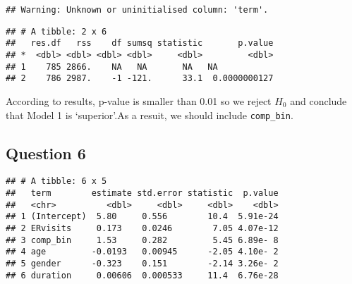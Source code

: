 \documentclass[]{article}
\newenvironment{Shaded}{\begin{snugshade}}{\end{snugshade}}
\newcommand{\KeywordTok}[1]{\textcolor[rgb]{0.13,0.29,0.53}{\textbf{#1}}}
\newcommand{\DataTypeTok}[1]{\textcolor[rgb]{0.13,0.29,0.53}{#1}}
\newcommand{\StringTok}[1]{\textcolor[rgb]{0.31,0.60,0.02}{#1}}
\newcommand{\CommentTok}[1]{\textcolor[rgb]{0.56,0.35,0.01}{\textit{#1}}}
\newcommand{\OperatorTok}[1]{\textcolor[rgb]{0.81,0.36,0.00}{\textbf{#1}}}
\newcommand{\NormalTok}[1]{#1}
\begin{document}
\begin{verbatim}
## Warning: Unknown or uninitialised column: 'term'.
\end{verbatim}

\begin{verbatim}
## # A tibble: 2 x 6
##   res.df   rss    df sumsq statistic       p.value
## *  <dbl> <dbl> <dbl> <dbl>     <dbl>         <dbl>
## 1    785 2866.    NA   NA       NA   NA           
## 2    786 2987.    -1 -121.      33.1  0.0000000127
\end{verbatim}

According to results, p-value is smaller than 0.01 so we reject \(H_0\)
and conclude that Model 1 is `superior'.As a resuit, we should include
\texttt{comp\_bin}.

\subsection{Question 6}\label{question-6}

\begin{Shaded}
\end{Shaded}

\begin{verbatim}
## # A tibble: 6 x 5
##   term        estimate std.error statistic  p.value
##   <chr>          <dbl>     <dbl>     <dbl>    <dbl>
## 1 (Intercept)  5.80     0.556        10.4  5.91e-24
## 2 ERvisits     0.173    0.0246        7.05 4.07e-12
## 3 comp_bin     1.53     0.282         5.45 6.89e- 8
## 4 age         -0.0193   0.00945      -2.05 4.10e- 2
## 5 gender      -0.323    0.151        -2.14 3.26e- 2
## 6 duration     0.00606  0.000533     11.4  6.76e-28
\end{verbatim}
\end{document}
